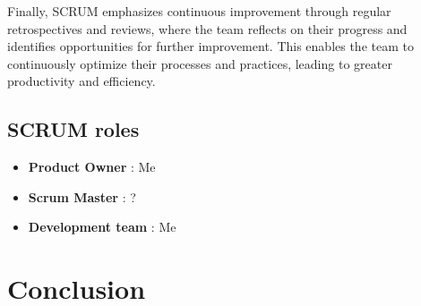 Finally, SCRUM emphasizes continuous improvement through regular retrospectives and reviews, where the team reflects on their progress and identifies opportunities for further improvement. This enables the team to continuously optimize their processes and practices, leading to greater productivity and efficiency.

\subsection{SCRUM roles}
\vspace{0.2cm}

\begin{itemize}

    \item\textbf{Product Owner} : Me
    
    \vspace{0.2cm}
    
    \item\textbf{Scrum Master} : ?
    
    \vspace{0.2cm}
    
    \item\textbf{Development team} : Me
    
\end{itemize}
\section{Conclusion}
